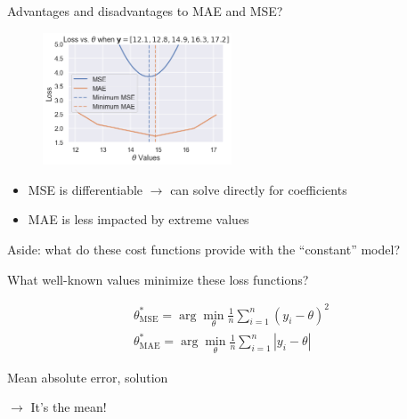 \documentclass[aspectratio=169]{beamer}
\begin{document}
\begin{frame}{Advantages and disadvantages to MAE and MSE?}
\begin{figure}
	\includegraphics[width=0.5\textwidth]{mae_vs_mse}
	\caption*{}
\end{figure}
\pause
\vspace{-10mm}
\begin{itemize}
	\item MSE is differentiable $\rightarrow$ can solve directly for coefficients
	\item MAE is less impacted by extreme values
\end{itemize}
\end{frame}

\begin{frame}{Aside: what do these cost functions provide with the ``constant'' model?}

What well-known values minimize these loss functions?

	\begin{align*}
		\theta^*_{\text{MSE}} = \arg \min_\theta  \frac{1}{n}\sum_{i=1}^n (y_i - \theta)^2\\
		\theta^*_{\text{MAE}} = \arg \min_\theta  \frac{1}{n}\sum_{i=1}^n |y_i - \theta|
	\end{align*}

\end{frame}

\begin{frame}{Mean absolute error, solution}


$\rightarrow $ It's the mean!

\end{frame}
\end{document}
